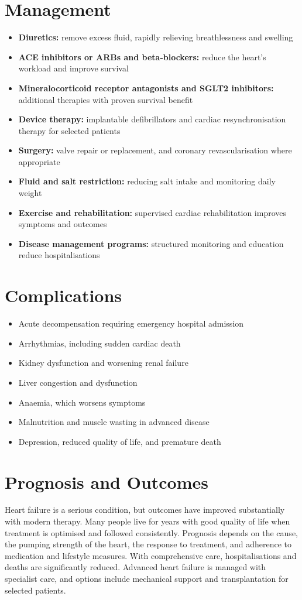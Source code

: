 \section*{Management}
\begin{itemize}
    \item \textbf{Diuretics:} remove excess fluid, rapidly relieving breathlessness and swelling
    \item \textbf{ACE inhibitors or ARBs and beta-blockers:} reduce the heart's workload and improve survival
    \item \textbf{Mineralocorticoid receptor antagonists and SGLT2 inhibitors:} additional therapies with proven survival benefit
    \item \textbf{Device therapy:} implantable defibrillators and cardiac resynchronisation therapy for selected patients
    \item \textbf{Surgery:} valve repair or replacement, and coronary revascularisation where appropriate
    \item \textbf{Fluid and salt restriction:} reducing salt intake and monitoring daily weight
    \item \textbf{Exercise and rehabilitation:} supervised cardiac rehabilitation improves symptoms and outcomes
    \item \textbf{Disease management programs:} structured monitoring and education reduce hospitalisations
\end{itemize}

\section*{Complications}
\begin{itemize}
    \item Acute decompensation requiring emergency hospital admission
    \item Arrhythmias, including sudden cardiac death
    \item Kidney dysfunction and worsening renal failure
    \item Liver congestion and dysfunction
    \item Anaemia, which worsens symptoms
    \item Malnutrition and muscle wasting in advanced disease
    \item Depression, reduced quality of life, and premature death
\end{itemize}

\section*{Prognosis and Outcomes}
Heart failure is a serious condition, but outcomes have improved substantially with modern therapy. Many people live for years with good quality of life when treatment is optimised and followed consistently. Prognosis depends on the cause, the pumping strength of the heart, the response to treatment, and adherence to medication and lifestyle measures. With comprehensive care, hospitalisations and deaths are significantly reduced. Advanced heart failure is managed with specialist care, and options include mechanical support and transplantation for selected patients.

